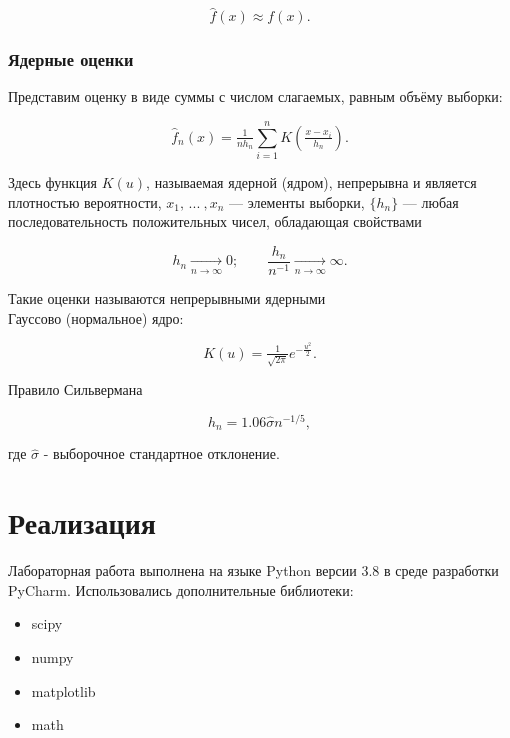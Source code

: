 \documentclass{article}
\begin{document}
\begin{equation}
    \widehat{f}(x) \approx f(x).
\end{equation}

\subsubsection{Ядерные оценки}
Представим оценку в виде суммы с числом слагаемых, равным объёму выборки:

\begin{equation}
    \widehat{f}_n(x) = \tfrac{1}{nh_n}\sum\limits_{i=1}^n K\left( \tfrac{x - x_i}{h_n} \right).
\end{equation}

Здесь функция $K(u)$, называемая ядерной (ядром), непрерывна и является плотностью вероятности, $x_1, \, ... \: , x_n$ --- элементы выборки, $\{h_n\}$ --- любая последовательность положительных чисел, обладающая свойствами

\begin{equation}
    h_n \underset{n \to \infty}{\longrightarrow} 0; \qquad \dfrac{h_n}{n^{-1}} \underset{n \to \infty}{\longrightarrow} \infty.
\end{equation}

Такие оценки называются непрерывными ядерными\\

Гауссово (нормальное) ядро:

\begin{equation}
    K(u) = \tfrac{1}{\sqrt{2\pi}}e^{-\tfrac{u^2}{2}}.
\end{equation}

Правило Сильвермана 

\begin{equation}
    h_n = 1.06\hat{\sigma}n^{-1/5},
\end{equation}

где $\hat{\sigma}$ - выборочное стандартное отклонение.

\newpage

\section{Реализация}

Лабораторная работа выполнена на языке Python версии 3.8 в среде разработки PyCharm.
Использовались дополнительные библиотеки:
\begin{itemize}
    \item scipy
    \item numpy
    \item matplotlib
    \item math
\end{itemize}
\end{document}
